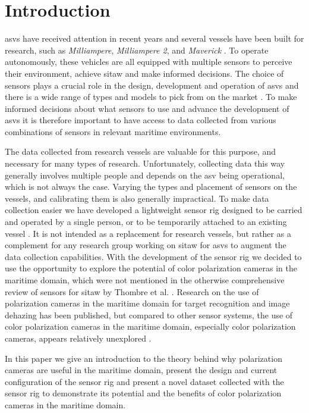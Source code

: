 \section{Introduction}
\glspl{asv} have received attention in recent years and several vessels have been built for research, such as \textit{Milliampere}, \textit{Milliampere 2}, and \textit{Maverick} \cite{brekkeMilliAmpereAutonomousFerry2022}\cite{zhangDesignBuildAutonomous2023}\cite{eideAutonomousUrbanPassenger2024}.
To operate autonomously, these vehicles are all equipped with multiple sensors to perceive their environment, achieve \gls{sitaw} and make informed decisions.
The choice of sensors plays a crucial role in the design, development and operation of \glspl{asv} and there is a wide range of types and models to pick from on the market \cite{thombreSensorsAITechniques2022}.
To make informed decisions about what sensors to use and advance the development of \glspl{asv} it is therefore important to have access to data collected from various combinations of sensors in relevant maritime environments.

The data collected from research vessels are valuable for this purpose, and necessary for many types of research.
Unfortunately, collecting data this way generally involves multiple people and depends on the \gls{asv} being operational, which is not always the case.
Varying the types and placement of sensors on the vessels, and calibrating them is also generally impractical.
To make data collection easier we have developed a lightweight sensor rig designed to be carried and operated by a single person, or to be temporarily attached to an existing vessel \cite{martensPavingWayEnhanced2023}.
It is not intended as a replacement for research vessels, but rather as a complement for any research group working on \gls{sitaw} for \glspl{asv} to augment the data collection capabilities.
With the development of the sensor rig we decided to use the opportunity to explore the potential of color polarization cameras in the maritime domain, which were not mentioned in the otherwise comprehensive review of sensors for \gls{sitaw} by Thombre et al. \cite{thombreSensorsAITechniques2022}.
Research on the use of polarization cameras in the maritime domain for target recognition and image dehazing has been published, but compared to other sensor systems, the use of color polarization cameras in the maritime domain, especially color polarization cameras, appears relatively unexplored \cite{zhongPolarizationintensityJointImaging2023}\cite{maPolarizationBasedMethodMaritime2024}.

In this paper we give an introduction to the theory behind why polarization cameras are useful in the maritime domain, present the design and current configuration of the sensor rig and present a novel dataset collected with the sensor rig to demonstrate its potential and the benefits of color polarization cameras in the maritime domain.

